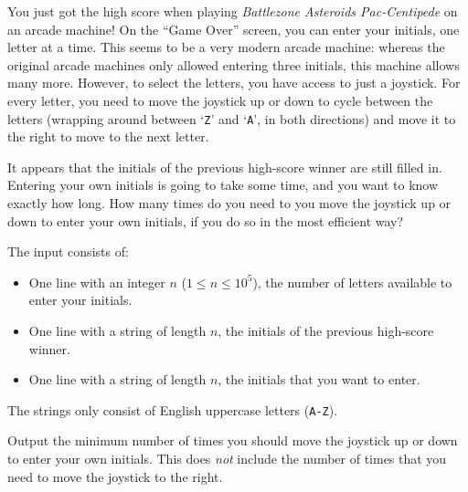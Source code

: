 

\newcommand{\maxn}{10^5}

You just got the high score when playing \emph{Battlezone Asteroids Pac-Centipede} on an arcade machine!
On the ``Game Over'' screen, you can enter your initials, one letter at a time.
This seems to be a very modern arcade machine:
whereas the original arcade machines only allowed entering three initials, this machine allows many more.
However, to select the letters, you have access to just a joystick.
For every letter, you need to move the joystick up or down to cycle between the letters
(wrapping around between `\texttt{Z}' and `\texttt{A}', in both directions)
and move it to the right to move to the next letter.

It appears that the initials of the previous high-score winner are still filled in.
Entering your own initials is going to take some time, and you want to know exactly how long.
How many times do you need to you move the joystick up or down to enter your own initials,
if you do so in the most efficient way?

\begin{Input}
    The input consists of:
    \begin{itemize}
        \item One line with an integer $n$ ($1 \leq n \leq \maxn$), the number of letters available to enter your initials.
        \item One line with a string of length $n$, the initials of the previous high-score winner.
        \item One line with a string of length $n$, the initials that you want to enter.
    \end{itemize}
    The strings only consist of English uppercase letters (\texttt{A-Z}).
\end{Input}

\begin{Output}
    Output the minimum number of times you should move the joystick up or down to enter your own initials.
    This does \emph{not} include the number of times that you need to move the joystick to the right.
\end{Output}
